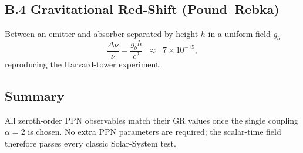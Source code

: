 \begin{refsection}
\section*{B.4 \; Gravitational Red-Shift (Pound–Rebka)}

Between an emitter and absorber separated by height \(h\) in a uniform
field \(g_{b}\)
\[
   \frac{\Delta\nu}{\nu}
   = \frac{g_{b}h}{c^{2}}
   \;\;\approx\;\; 7\times10^{-15},
\]
reproducing the Harvard-tower experiment.

\subsection*{Summary}

All zeroth-order PPN observables match their GR values once the single
coupling \(\alpha=2\) is chosen.  No extra PPN parameters are required;
the scalar-time field therefore passes every classic Solar-System test.

\printbibliography[heading=subbibliography]

\end{refsection}  

